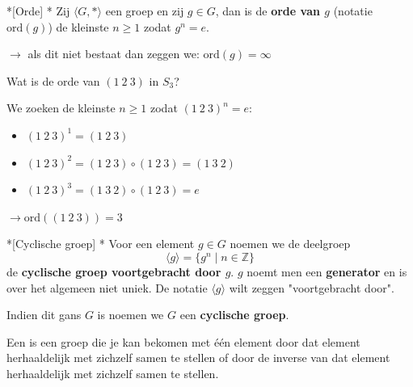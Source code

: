\begin{nicedefinition}*[Orde]
    \nextpart[]*
    Zij $\langle G,* \rangle$ een groep en zij $g \in G$, dan is de \textcolor{PineGreen!75!black}{\textbf{orde van $g$}} (notatie $\text{ord}(g)$) de kleinste $n \ge 1$ zodat $g^n=e$.

    \vspace{0.15cm}

    $\to$ als dit niet bestaat dan zeggen we: $\text{ord}(g) = \infty$
\end{nicedefinition}

\begin{niceexample}
    Wat is de orde van $(1\ 2\ 3)$ in $S_3$?
\end{niceexample}

\textbf{} We zoeken de kleinste $n \ge 1$ zodat $(1\ 2\ 3)^n = e$:
\begin{itemize}
    \item $(1\ 2\ 3)^1 = (1\ 2\ 3)$
    \item $(1\ 2\ 3)^2 = (1\ 2\ 3) \circ (1\ 2\ 3) = (1\ 3\ 2)$
    \item $(1\ 2\ 3)^3 = (1\ 3\ 2) \circ (1\ 2\ 3) = e$
\end{itemize}
$\to \text{ord}((1\ 2\ 3)) = 3$

\begin{nicedefinition}*[Cyclische groep]
    \nextpart[]*
    Voor een element $g \in G$ noemen we de deelgroep
    \begin{equation*}
        \langle g \rangle = \{g^n \mid n \in \mathbb{Z}\}
    \end{equation*}
    de \textcolor{PineGreen!75!black}{\textbf{cyclische groep voortgebracht door $g$}}. $g$ noemt men een \textcolor{PineGreen!75!black}{\textbf{generator}} en is over het algemeen niet uniek. De notatie $\langle g \rangle$ wilt zeggen "voortgebracht door".

    \vspace{0.25cm}

    Indien dit gans $G$ is noemen we $G$ een \textcolor{PineGreen!75!black}{\textbf{cyclische groep}}.
\end{nicedefinition}

Een  is een groep die je kan bekomen met één element door dat element herhaaldelijk met zichzelf samen te stellen of door de inverse van dat element herhaaldelijk met zichzelf samen te stellen.

